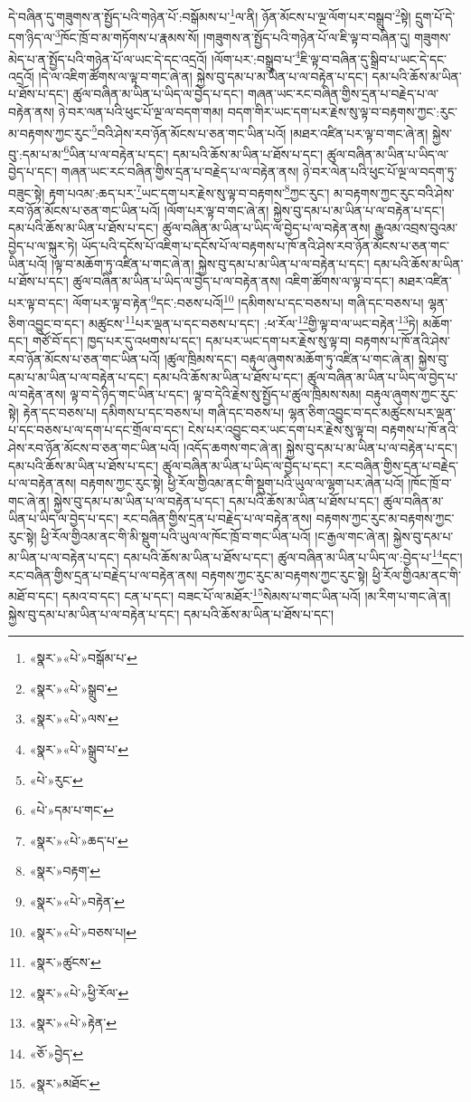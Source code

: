དེ་བཞིན་དུ་གཟུགས་ན་སྤྱོད་པའི་གཉེན་པོ་:བསྒོམས་པ་\footnote{«སྣར་»«པེ་»བསྒོམ་པ་}ལ་ནི། ཉོན་མོངས་པ་ལྔ་ལོག་པར་བསྒྲུབ་\footnote{«སྣར་»«པེ་»སྒྲུབ་}སྟེ། དྲུག་པོ་དེ་དག་ཉིད་ལ་\footnote{«སྣར་»«པེ་»ལས་}ཁོང་ཁྲོ་བ་མ་གཏོགས་པ་རྣམས་སོ། །གཟུགས་ན་སྤྱོད་པའི་གཉེན་པོ་ལ་ཇི་ལྟ་བ་བཞིན་དུ། གཟུགས་མེད་པ་ན་སྤྱོད་པའི་གཉེན་པོ་ལ་ཡང་དེ་དང་འདྲའོ། །ལོག་པར་:བསྒྲུབ་པ་\footnote{«སྣར་»«པེ་»སྒྲུབ་པ་}ཇི་ལྟ་བ་བཞིན་དུ་སྒྲིབ་པ་ཡང་དེ་དང་འདྲའོ། །དེ་ལ་འཇིག་ཚོགས་ལ་ལྟ་བ་གང་ཞེ་ན། སྐྱེས་བུ་དམ་པ་མ་ཡིན་པ་ལ་བརྟེན་པ་དང་། དམ་པའི་ཆོས་མ་ཡིན་པ་ཐོས་པ་དང་། ཚུལ་བཞིན་མ་ཡིན་པ་ཡིད་ལ་བྱེད་པ་དང་། གཞན་ཡང་རང་བཞིན་གྱིས་དྲན་པ་བརྗེད་པ་ལ་བརྟེན་ནས། ཉེ་བར་ལན་པའི་ཕུང་པོ་ལྔ་ལ་བདག་གམ། བདག་གིར་ཡང་དག་པར་རྗེས་སུ་ལྟ་བ་བརྟགས་ཀྱང་:རུང་མ་བརྟགས་ཀྱང་རུང་\footnote{«པེ་»རུང་}བའི་ཤེས་རབ་ཉོན་མོངས་པ་ཅན་གང་ཡིན་པའོ། །མཐར་འཛིན་པར་ལྟ་བ་གང་ཞེ་ན། སྐྱེས་བུ་:དམ་པ་མ་\footnote{«པེ་»དམ་པ་གང་}ཡིན་པ་ལ་བརྟེན་པ་དང་། དམ་པའི་ཆོས་མ་ཡིན་པ་ཐོས་པ་དང་། ཚུལ་བཞིན་མ་ཡིན་པ་ཡིད་ལ་བྱེད་པ་དང་། གཞན་ཡང་རང་བཞིན་གྱིས་དྲན་པ་བརྗེད་པ་ལ་བརྟེན་ནས། ཉེ་བར་ལེན་པའི་ཕུང་པོ་ལྔ་ལ་བདག་ཏུ་བཟུང་སྟེ། རྟག་པའམ་:ཆད་པར་\footnote{«སྣར་»«པེ་»ཆད་པ་}ཡང་དག་པར་རྗེས་སུ་ལྟ་བ་བརྟགས་\footnote{«སྣར་»བརྟག་}ཀྱང་རུང་། མ་བརྟགས་ཀྱང་རུང་བའི་ཤེས་རབ་ཉོན་མོངས་པ་ཅན་གང་ཡིན་པའོ། །ལོག་པར་ལྟ་བ་གང་ཞེ་ན། སྐྱེས་བུ་དམ་པ་མ་ཡིན་པ་ལ་བརྟེན་པ་དང་། དམ་པའི་ཆོས་མ་ཡིན་པ་ཐོས་པ་དང་། ཚུལ་བཞིན་མ་ཡིན་པ་ཡིད་ལ་བྱེད་པ་ལ་བརྟེན་ནས། རྒྱུའམ་འབྲས་བུའམ་བྱེད་པ་ལ་སྐུར་ཏེ། ཡོད་པའི་དངོས་པོ་འཇིག་པ་དངོས་པོ་ལ་བརྟགས་པ་ཁོ་ནའི་ཤེས་རབ་ཉོན་མོངས་པ་ཅན་གང་ཡིན་པའོ། །ལྟ་བ་མཆོག་ཏུ་འཛིན་པ་གང་ཞེ་ན། སྐྱེས་བུ་དམ་པ་མ་ཡིན་པ་ལ་བརྟེན་པ་དང་། དམ་པའི་ཆོས་མ་ཡིན་པ་ཐོས་པ་དང་། ཚུལ་བཞིན་མ་ཡིན་པ་ཡིད་ལ་བྱེད་པ་ལ་བརྟེན་ནས། འཇིག་ཚོགས་ལ་ལྟ་བ་དང་། མཐར་འཛིན་པར་ལྟ་བ་དང་། ལོག་པར་ལྟ་བ་རྟེན་\footnote{«སྣར་»«པེ་»བརྟེན་}དང་:བཅས་པའོ།\footnote{«སྣར་»«པེ་»བཅས་པ།} །དམིགས་པ་དང་བཅས་པ། གཞི་དང་བཅས་པ། ལྷན་ཅིག་འབྱུང་བ་དང་། མཚུངས་\footnote{«སྣར་»ཚུངས་}པར་ལྡན་པ་དང་བཅས་པ་དང་། :ཕ་རོལ་\footnote{«སྣར་»«པེ་»ཕྱི་རོལ་}གྱི་ལྟ་བ་ལ་ཡང་བརྟེན་\footnote{«སྣར་»«པེ་»རྟེན་}ཏེ། མཆོག་དང་། གཙོ་བོ་དང་། ཁྱད་པར་དུ་འཕགས་པ་དང་། དམ་པར་ཡང་དག་པར་རྗེས་སུ་ལྟ་བ། བརྟགས་པ་ཁོ་ནའི་ཤེས་རབ་ཉོན་མོངས་པ་ཅན་གང་ཡིན་པའོ། །ཚུལ་ཁྲིམས་དང་། བརྟུལ་ཞུགས་མཆོག་ཏུ་འཛིན་པ་གང་ཞེ་ན། སྐྱེས་བུ་དམ་པ་མ་ཡིན་པ་ལ་བརྟེན་པ་དང་། དམ་པའི་ཆོས་མ་ཡིན་པ་ཐོས་པ་དང་། ཚུལ་བཞིན་མ་ཡིན་པ་ཡིད་ལ་བྱེད་པ་ལ་བརྟེན་ནས། ལྟ་བ་དེ་ཉིད་གང་ཡིན་པ་དང་། ལྟ་བ་དེའི་རྗེས་སུ་སྤྱོད་པ་ཚུལ་ཁྲིམས་སམ། བརྟུལ་ཞུགས་ཀྱང་རུང་སྟེ། རྟེན་དང་བཅས་པ། དམིགས་པ་དང་བཅས་པ། གཞི་དང་བཅས་པ། ལྷན་ཅིག་འབྱུང་བ་དང་མཚུངས་པར་ལྡན་པ་དང་བཅས་པ་ལ་དག་པ་དང་གྲོལ་བ་དང་། ངེས་པར་འབྱུང་བར་ཡང་དག་པར་རྗེས་སུ་ལྟ་བ། བརྟགས་པ་ཁོ་ནའི་ཤེས་རབ་ཉོན་མོངས་བ་ཅན་གང་ཡིན་པའོ། །འདོད་ཆགས་གང་ཞེ་ན། སྐྱེས་བུ་དམ་པ་མ་ཡིན་པ་ལ་བརྟེན་པ་དང་། དམ་པའི་ཆོས་མ་ཡིན་པ་ཐོས་པ་དང་། ཚུལ་བཞིན་མ་ཡིན་པ་ཡིད་ལ་བྱེད་པ་དང་། རང་བཞིན་གྱིས་དྲན་པ་བརྗེད་པ་ལ་བརྟེན་ནས། བརྟགས་ཀྱང་རུང་སྟེ། ཕྱི་རོལ་གྱིའམ་ནང་གི་སྡུག་པའི་ཡུལ་ལ་ལྷག་པར་ཞེན་པའོ། །ཁོང་ཁྲོ་བ་གང་ཞེ་ན། སྐྱེས་བུ་དམ་པ་མ་ཡིན་པ་ལ་བརྟེན་པ་དང་། དམ་པའི་ཆོས་མ་ཡིན་པ་ཐོས་པ་དང་། ཚུལ་བཞིན་མ་ཡིན་པ་ཡིད་ལ་བྱེད་པ་དང་། རང་བཞིན་གྱིས་དྲན་པ་བརྗེད་པ་ལ་བརྟེན་ནས། བརྟགས་ཀྱང་རུང་མ་བརྟགས་ཀྱང་རུང་སྟེ། ཕྱི་རོལ་གྱིའམ་ནང་གི་མི་སྡུག་པའི་ཡུལ་ལ་ཁོང་ཁྲོ་བ་གང་ཡིན་པའོ། །ང་རྒྱལ་གང་ཞེ་ན། སྐྱེས་བུ་དམ་པ་མ་ཡིན་པ་ལ་བརྟེན་པ་དང་། དམ་པའི་ཆོས་མ་ཡིན་པ་ཐོས་པ་དང་། ཚུལ་བཞིན་མ་ཡིན་པ་ཡིད་ལ་:བྱེད་པ་\footnote{«ཅོ་»བྱེད་}དང་། རང་བཞིན་གྱིས་དྲན་པ་བརྗེད་པ་ལ་བརྟེན་ནས། བརྟགས་ཀྱང་རུང་མ་བརྟགས་ཀྱང་རུང་སྟེ། ཕྱི་རོལ་གྱིའམ་ནང་གི་མཐོ་བ་དང་། དམའ་བ་དང་། ངན་པ་དང་། བཟང་པོ་ལ་མཐོར་\footnote{«སྣར་»མཐོང་}སེམས་པ་གང་ཡིན་པའོ། །མ་རིག་པ་གང་ཞེ་ན། སྐྱེས་བུ་དམ་པ་མ་ཡིན་པ་ལ་བརྟེན་པ་དང་། དམ་པའི་ཆོས་མ་ཡིན་པ་ཐོས་པ་དང་། 